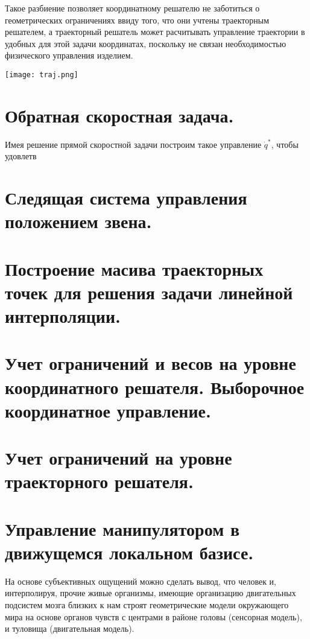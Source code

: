 \documentclass[12pt,a4paper,titlepage]{article}
\begin{document}
Такое разбиение позволяет координатному решателю не заботиться о геометрических ограничениях ввиду того, что они учтены траекторным решателем, а траекторный решатель может расчитывать управление траектории в удобных для этой задачи координатах, поскольку не связан необходимостью физического управления изделием.   

\begin{center}
  \texttt{[image: traj.png]}
  \label{}
\end{center}


\newpage
\section{Обратная скоростная задача.}

Имея решение прямой скоростной задачи построим такое управление $\dot{q}^{*}$, чтобы удовлетв 

\newpage
\section{Следящая система управления положением звена.}

\newpage
\section{Построение масива траекторных точек для решения задачи линейной интерполяции.}

\newpage
\section{Учет ограничений и весов на уровне координатного решателя. Выборочное координатное управление.}

\newpage
\section{Учет ограничений на уровне траекторного решателя.}

\newpage
\section{Управление манипулятором в движущемся локальном базисе.}
На основе субъективных ощущений можно сделать вывод, что человек и, интерполируя, прочие живые организмы, имеющие организацию двигательных подсистем мозга близких к нам строят геометрические модели окружающего мира на основе органов чувств с центрами в районе головы (сенсорная модель), и туловища (двигательная модель).
\end{document}
